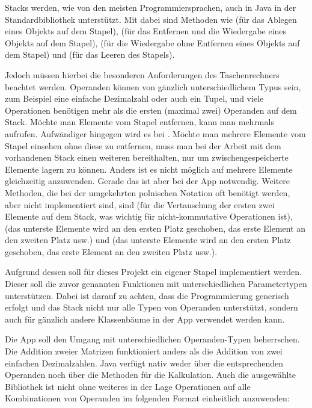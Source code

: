 Stacks werden, wie von den meisten Programmiersprachen, auch in Java in der Standardbibliothek unterstützt. Mit dabei sind Methoden wie  (für das Ablegen eines Objekts auf dem Stapel),  (für das Entfernen und die Wiedergabe eines Objekts auf dem Stapel),  (für die Wiedergabe ohne Entfernen eines Objekts auf dem Stapel) und  (für das Leeren des Stapels). 

Jedoch müssen hierbei die besonderen Anforderungen des Taschenrechners beachtet werden. Operanden können von gänzlich unterschiedlichem Typus sein, zum Beispiel eine einfache Dezimalzahl oder auch ein Tupel, und viele Operationen benötigen mehr als die ersten (maximal zwei) Operanden auf dem Stack. Möchte man Elemente vom Stapel entfernen, kann man  mehrmals aufrufen. Aufwändiger hingegen wird es bei . Möchte man mehrere Elemente vom Stapel einsehen ohne diese zu entfernen, muss man bei der Arbeit mit dem vorhandenen Stack einen weiteren bereithalten, nur um zwischengespeicherte Elemente lagern zu können. Anders ist es nicht möglich  auf mehrere Elemente gleichzeitig anzuwenden. Gerade das ist aber bei der App notwendig. Weitere Methoden, die bei der umgekehrten polnischen Notation oft benötigt werden, aber nicht implementiert sind, sind  (für die Vertauschung der ersten zwei Elemente auf dem Stack, was wichtig für nicht-kommutative Operationen ist),  (das unterste Elemente wird an den ersten Platz geschoben, das erste Element an den zweiten Platz usw.) und  (das unterste Elemente wird an den ersten Platz geschoben, das erste Element an den zweiten Platz usw.).

Aufgrund dessen soll für dieses Projekt ein eigener Stapel implementiert werden. Dieser soll die zuvor genannten Funktionen mit unterschiedlichen Parametertypen unterstützen. Dabei ist darauf zu achten, dass die Programmierung generisch erfolgt und das Stack nicht nur alle Typen von Operanden unterstützt, sondern auch für gänzlich andere Klassenbäume in der App verwendet werden kann.

Die App soll den Umgang mit unterschiedlichen Operanden-Typen beherrschen. Die Addition zweier Matrizen funktioniert anders als die Addition von zwei einfachen Dezimalzahlen. Java verfügt nativ weder über die entsprechenden Operanden noch über die Methoden für die Kalkulation. Auch die ausgewählte Bibliothek ist nicht ohne weiteres in der Lage Operationen auf alle Kombinationen von Operanden im folgenden Format einheitlich anzuwenden:


